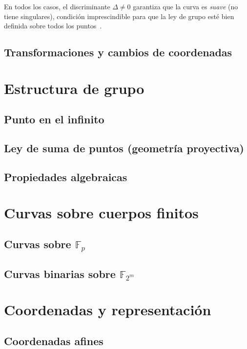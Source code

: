 En todos los casos, el discriminante \(\Delta\neq0\) garantiza que la curva es \emph{suave} (no tiene singulares), condición imprescindible para que la ley de grupo esté bien definida sobre todos los puntos~\cite[Ch.\,III]{SilvermanAEC}.


\subsection{Transformaciones y cambios de coordenadas}

\section{Estructura de grupo}
\subsection{Punto en el infinito}
\subsection{Ley de suma de puntos (geometría proyectiva)}
\subsection{Propiedades algebraicas}

\section{Curvas sobre cuerpos finitos}\label{sec:curvas_sobre_cuerpos_finitos}
\subsection{Curvas sobre \texorpdfstring{$\mathbb{F}_p$}{Fp}}\label{sec:curvas_sobre_cuerpos_finitos_primos}
\subsection{Curvas binarias sobre \texorpdfstring{$\mathbb{F}_{2^m}$}{F2m}}\label{sec:curvas_sobre_cuerpos_finitos_binarios}

\section{Coordenadas y representación}\label{sec:coordenadas_curvas_elipticas}
\subsection{Coordenadas afines}
